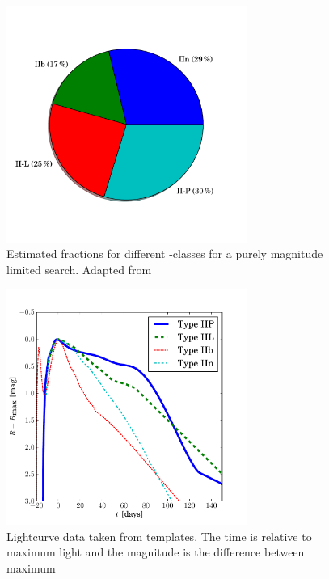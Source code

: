 \begin{figure}[htbp] %
   \centering
   \includegraphics[width=0.7\textwidth, trim=0 2.5cm 0 0cm]{chapter_intro/plots/plot_ii_fracs.pdf} 
   \caption{Estimated fractions for different -classes for a purely magnitude limited search. Adapted from \citet{2011MNRAS.412.1441L}}
   \label{fig:ii_fracs}
\end{figure}

\begin{figure}[htbp] %
   \centering
   \includegraphics[width=0.7\textwidth]{chapter_intro/plots/plot_li11_lc_type2.pdf} 
   \caption{Lightcurve data taken from \citet{2011MNRAS.412.1441L} templates. The time is relative to maximum light and the magnitude is the difference between maximum  }
   \label{fig:snii_lc}
\end{figure}

